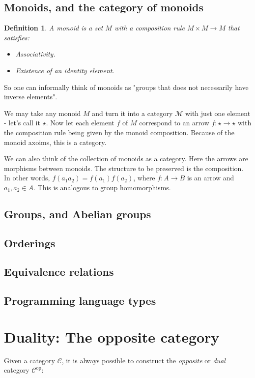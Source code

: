 \documentclass[12pt, a4paper]{article}
\newtheorem{definition}{Definition}[section]
\numberwithin{equation}{section}
\begin{document}
\subsection{Monoids, and the category of monoids}
\begin{definition}
A monoid is a set $M$ with a composition rule $M\times M\rightarrow M$ that satisfies:
\begin{itemize}
\item Associativity.
\item Existence of an identity element.
\end{itemize}
\end{definition}

So one can informally think of monoids as "groups that does not necessarily have inverse elements".

We may take any monoid $M$ and turn it into a category $\mathcal{M}$ with just one element - let's call it $\star$. Now let each element $f$ of $M$ correspond to an arrow $f:\star\rightarrow\star$ with the composition rule being given by the monoid composition. Because of the monoid axoims, this is a category.

We can also think of the collection of monoids as a category. Here the arrows are morphisms between monoids. The structure to be preserved is the composition. In other words, $f(a_1a_2)=f(a_1)f(a_2)$, where $f: A\rightarrow B$ is an arrow and $a_1,a_2\in A$. This is analogous to group homomorphisms.

\subsection{Groups, and Abelian groups}

\subsection{Orderings}

\subsection{Equivalence relations}

\subsection{Programming language types}

\section{Duality: The opposite category}
Given a category $\mathcal{C}$, it is always possible to construct the \textit{opposite} or \textit{dual} category $\mathcal{C}^{\textrm{op}}$:
\end{document}
